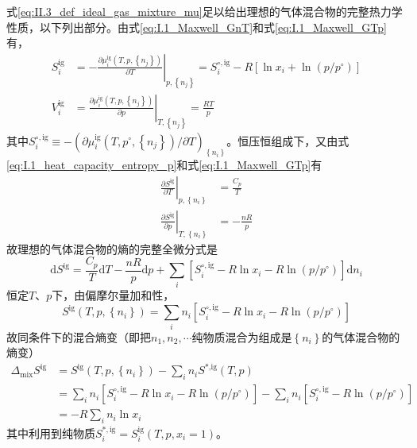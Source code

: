 \documentclass[main.tex]{subfiles}
\begin{document}
式\eqref{eq:II.3_def_ideal_gas_mixture_mu}足以给出理想的气体混合物的完整热力学性质，以下列出部分。由式\eqref{eq:I.1_Maxwell_GnT}和式\eqref{eq:I.1_Maxwell_GTp}有，
\begin{align}
  S^\text{ig}_i & =-\left.\frac{\partial \mu^\text{ig}_i\left(T,p,\left\{n_j\right\}\right)}{\partial T}\right|_{p,\left\{n_j\right\}}=S_i^{\circ,\text{ig}}-R\left[\ln x_i+\ln \left(p/p^\circ\right)\right] \\
  V^\text{ig}_i & =\left.\frac{\partial\mu^\text{ig}_i\left(T,p,\left\{n_j\right\}\right)}{\partial p}\right|_{T,\left\{n_j\right\}}=\frac{RT}{p}
\end{align}
其中$S_i^{\circ,\text{ig}}\equiv-\left(\partial\mu_i^\text{ig}\left(T,p^\circ,\left\{n_j\right\}\right)/\partial T\right)_{\left\{n_i\right\}}$。恒压恒组成下，又由式\eqref{eq:I.1_heat_capacity_entropy_p}和式\eqref{eq:I.1_Maxwell_GTp}有
\begin{align}
  \left.\frac{\partial S^\text{ig}}{\partial T}\right|_{p,\left\{n_i\right\}} & =\frac{C_p}{T} \\
  \left.\frac{\partial S^\text{ig}}{\partial p}\right|_{T,\left\{n_i\right\}} & =-\frac{nR}{p}
\end{align}
故理想的气体混合物的熵的完整全微分式是
\[\mathrm{d}S^\text{ig}=\frac{C_p}{T}\mathrm{d}T-\frac{nR}{p}\mathrm{d}p+\sum_i\left[S_i^{\circ,\text{ig}}-R\ln x_i-R\ln\left(p/p^\circ\right)\right]\mathrm{d}n_i\]
恒定$T$、$p$下，由偏摩尔量加和性，
\[S^\text{ig}\left(T,p,\left\{n_i\right\}\right)=\sum_in_i\left[S_i^{\circ,\text{ig}}-R\ln x_i-R\ln\left(p/ p^\circ\right)\right]\]
故同条件下的混合熵变（即把$n_1,n_2,\cdots$纯物质混合为组成是$\left\{n_i\right\}$的气体混合物的熵变）
\begin{align*}
  \Delta_\text{mix}S^\text{ig} & =S^\text{ig}\left(T,p,\left\{n_i\right\}\right)-\sum_i n_i S^\text{*,ig}\left(T,p\right)                                                                \\
                               & =\sum_in_i\left[S_i^{\circ,\text{ig}}-R\ln x_i-R\ln\left(p/p^\circ\right)\right]-\sum_in_i\left[S_i^{\circ,\text{ig}}-R\ln\left(p/p^\circ\right)\right] \\
                               & =-R\sum_in_i\ln x_i
\end{align*}
其中利用到纯物质$S_i^{*,\text{ig}}=S_i^\text{ig}\left(T,p,x_i=1\right)$。
\end{document}
